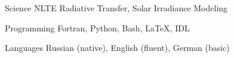

\begin{cvskills}

  \cvskill
    {Science} %
    {NLTE Radiative Transfer, Solar Irradiance Modeling} %

  \cvskill
    {Programming} %
    {Fortran, Python, Bash, LaTeX, IDL} %

  \cvskill
    {Languages} %
    {Russian (native), English (fluent), German (basic)} %

\end{cvskills}
